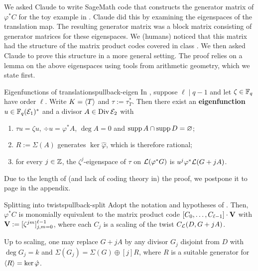 \documentclass[twocolumn, 11pt]{scrartcl}
\begin{document}
We asked Claude to write SageMath code that constructs the generator matrix of $\varphi^*C$ for the toy example in . Claude did this by examining the eigenspaces of the translation map. The resulting generator matrix was a block matrix consisting of generator matrices for these eigenspaces. We (humans) noticed that this matrix had the structure of the matrix product codes covered in class \cite{mh4310ld7,blackmore2001matrix}. We then asked Claude to prove this structure in a more general setting. The proof relies on a lemma on the above eigenspaces using tools from arithmetic geometry, which we state first.

\begin{lemma}{Eigenfunctions of translations}{pullback-eigen}
    In , suppose $\ell\mid q-1$ and let $\zeta\in\mathbb{F}_q$ have order $\ell$. Write $K=\langle T\rangle$ and $\tau:=\tau_T^*$. Then there exist an \textbf{eigenfunction} $u\in\mathbb{F}_q(\mathcal{E}_1)^*$ and a divisor $A\in\operatorname{Div}\mathcal{E}_2$ with
    \begin{enumerate}[label={(\alph*)}, left=-4pt, topsep=-10pt, itemsep=-3pt]
        \item \label{enum:eigen-u} $\tau u=\zeta u$, $\div u=\varphi^*A$, $\deg A=0$ and $\operatorname{supp} A\cap\operatorname{supp} D=\varnothing$;
        \item \label{enum:eigen-R} $R:=\Sigma(A)$ generates $\ker\hat\varphi$, which is therefore rational;
        \item \label{enum:eigen-space} for every $j\in\mathbb{Z}$, the $\zeta^j$-eigenspace of $\tau$ on $\mathcal{L}(\varphi^*G)$ is $u^j\varphi^*\mathcal{L}(G+jA)$.
    \end{enumerate}
\end{lemma}

Due to the length of (and lack of coding theory in) the proof, we postpone it to page \pageref{proof:pullback-eigen} in the appendix.

\begin{theorem}{Splitting into twists}{pullback-split}
    Adopt the notation and hypotheses of . Then, $\varphi^*C$ is monomially equivalent to the matrix product code $[C_0,\hdots,C_{\ell-1}]\cdot \mathbf{V}$ with $\mathbf{V}:=[\zeta^{jm}]_{j,m=0}^{\ell-1}$, where each $C_j$ is a scaling of the twist $C_\mathcal{L}(D,G+jA)$.
    
    \setlength{\parskip}{5pt}
    Up to scaling, one may replace $G+jA$ by any divisor $G_j$ disjoint from $D$ with $\deg G_j=k$ and $\Sigma(G_j)=\Sigma(G)\oplus[j]R$, where $R$ is a suitable generator for $\langle R\rangle=\ker\hat\varphi$.
\end{theorem}
\end{document}
